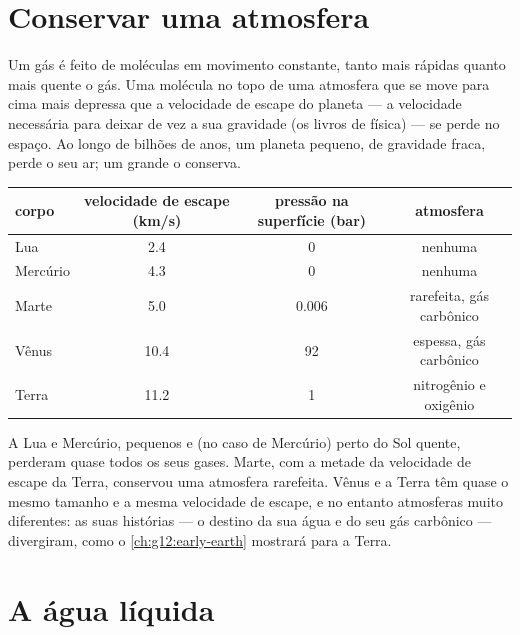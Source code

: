 \section{Conservar uma atmosfera}

Um gás é feito de moléculas em movimento constante, tanto mais rápidas
quanto mais quente o gás. Uma molécula no topo de uma atmosfera que se move
para cima mais depressa que a velocidade de escape do planeta --- a
velocidade necessária para deixar de vez a sua gravidade (os livros de
física) --- se perde no espaço. Ao longo de bilhões de anos, um planeta
pequeno, de gravidade fraca, perde o seu ar; um grande o conserva.

\begin{center}
\small
\begin{tabular}{lccc}
\hline
corpo & velocidade de escape (\unit{km/s}) & pressão na superfície (bar) & atmosfera \\
\hline
Lua & 2.4 & 0 & nenhuma \\
Mercúrio & 4.3 & 0 & nenhuma \\
Marte & 5.0 & 0.006 & rarefeita, gás carbônico \\
Vênus & 10.4 & 92 & espessa, gás carbônico \\
Terra & 11.2 & 1 & nitrogênio e oxigênio \\
\hline
\end{tabular}
\end{center}

\begin{remark}\label{rem:g10:habitable-planet:size}
A Lua e Mercúrio, pequenos e (no caso de Mercúrio) perto do Sol quente,
perderam quase todos os seus gases. Marte, com a metade da velocidade de
escape da Terra, conservou uma atmosfera rarefeita. Vênus e a Terra têm
quase o mesmo tamanho e a mesma velocidade de escape, e no entanto
atmosferas muito diferentes: as suas histórias --- o destino da sua água e
do seu gás carbônico --- divergiram, como o \cref{ch:g12:early-earth}
mostrará para a Terra.
\end{remark}

\section{A água líquida}

